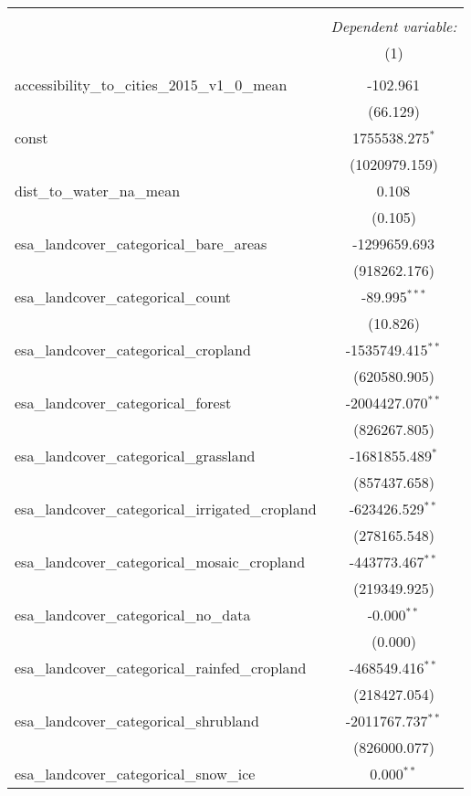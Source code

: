 \begin{table}[!htbp] \centering
\begin{tabular}{@{\extracolsep{5pt}}lc}
\\[-1.8ex]\hline
\hline \\[-1.8ex]
& \multicolumn{1}{c}{\textit{Dependent variable:}} \
\cr \cline{1-2}
\\[-1.8ex] & (1) \\
\hline \\[-1.8ex]
 accessibility_to_cities_2015_v1_0_mean & -102.961$^{}$ \\
  & (66.129) \\
 const & 1755538.275$^{*}$ \\
  & (1020979.159) \\
 dist_to_water_na_mean & 0.108$^{}$ \\
  & (0.105) \\
 esa_landcover_categorical_bare_areas & -1299659.693$^{}$ \\
  & (918262.176) \\
 esa_landcover_categorical_count & -89.995$^{***}$ \\
  & (10.826) \\
 esa_landcover_categorical_cropland & -1535749.415$^{**}$ \\
  & (620580.905) \\
 esa_landcover_categorical_forest & -2004427.070$^{**}$ \\
  & (826267.805) \\
 esa_landcover_categorical_grassland & -1681855.489$^{*}$ \\
  & (857437.658) \\
 esa_landcover_categorical_irrigated_cropland & -623426.529$^{**}$ \\
  & (278165.548) \\
 esa_landcover_categorical_mosaic_cropland & -443773.467$^{**}$ \\
  & (219349.925) \\
 esa_landcover_categorical_no_data & -0.000$^{**}$ \\
  & (0.000) \\
 esa_landcover_categorical_rainfed_cropland & -468549.416$^{**}$ \\
  & (218427.054) \\
 esa_landcover_categorical_shrubland & -2011767.737$^{**}$ \\
  & (826000.077) \\
 esa_landcover_categorical_snow_ice & 0.000$^{**}$ \\

\end{tabular}
\end{table}
